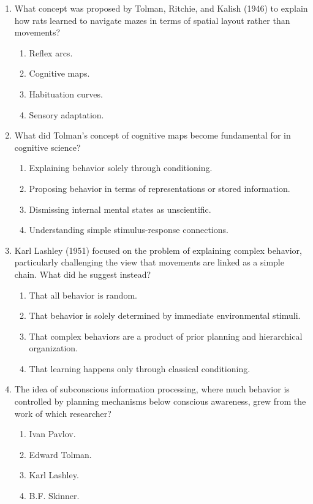 \documentclass{article}
\begin{document}
\begin{enumerate}[label=\arabic*.]
\item What concept was proposed by Tolman, Ritchie, and Kalish (1946) to explain how rats learned to navigate mazes in terms of spatial layout rather than movements?
\begin{enumerate}[label=(\alph*)]
    \item Reflex arcs.
    \item Cognitive maps.
    \item Habituation curves.
    \item Sensory adaptation.
\end{enumerate}

\item What did Tolman's concept of cognitive maps become fundamental for in cognitive science?
\begin{enumerate}[label=(\alph*)]
    \item Explaining behavior solely through conditioning.
    \item Proposing behavior in terms of representations or stored information.
    \item Dismissing internal mental states as unscientific.
    \item Understanding simple stimulus-response connections.
\end{enumerate}

\item Karl Lashley (1951) focused on the problem of explaining complex behavior, particularly challenging the view that movements are linked as a simple chain. What did he suggest instead?
\begin{enumerate}[label=(\alph*)]
    \item That all behavior is random.
    \item That behavior is solely determined by immediate environmental stimuli.
    \item That complex behaviors are a product of prior planning and hierarchical organization.
    \item That learning happens only through classical conditioning.
\end{enumerate}

\item The idea of subconscious information processing, where much behavior is controlled by planning mechanisms below conscious awareness, grew from the work of which researcher?
\begin{enumerate}[label=(\alph*)]
    \item Ivan Pavlov.
    \item Edward Tolman.
    \item Karl Lashley.
    \item B.F. Skinner.
\end{enumerate}


\end{enumerate}
\end{document}
